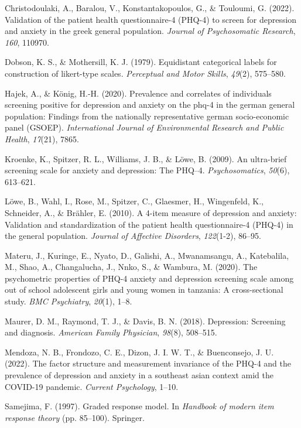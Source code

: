 \documentclass[
  man,floatsintext]{apa6}
\newlength{\cslhangindent}
\newlength{\cslentryspacingunit} %
\newenvironment{CSLReferences}[2] %
 {%
  \setlength{\parindent}{0pt}
  \ifodd #1
  \let\oldpar\par
  \def\par{\hangindent=\cslhangindent\oldpar}
  \fi
  \setlength{\parskip}{#2\cslentryspacingunit}
 }%
 {}
\begin{document}
\hypertarget{refs}{}
\begin{CSLReferences}{1}{0}
\leavevmode{}%
Christodoulaki, A., Baralou, V., Konstantakopoulos, G., \& Touloumi, G. (2022). Validation of the patient health questionnaire-4 (PHQ-4) to screen for depression and anxiety in the greek general population. \emph{Journal of Psychosomatic Research}, \emph{160}, 110970.

\leavevmode{}%
Dobson, K. S., \& Mothersill, K. J. (1979). Equidistant categorical labels for construction of likert-type scales. \emph{Perceptual and Motor Skills}, \emph{49}(2), 575--580.

\leavevmode{}%
Hajek, A., \& König, H.-H. (2020). Prevalence and correlates of individuals screening positive for depression and anxiety on the phq-4 in the german general population: Findings from the nationally representative german socio-economic panel (GSOEP). \emph{International Journal of Environmental Research and Public Health}, \emph{17}(21), 7865.

\leavevmode{}%
Kroenke, K., Spitzer, R. L., Williams, J. B., \& Löwe, B. (2009). An ultra-brief screening scale for anxiety and depression: The PHQ--4. \emph{Psychosomatics}, \emph{50}(6), 613--621.

\leavevmode{}%
Löwe, B., Wahl, I., Rose, M., Spitzer, C., Glaesmer, H., Wingenfeld, K., Schneider, A., \& Brähler, E. (2010). A 4-item measure of depression and anxiety: Validation and standardization of the patient health questionnaire-4 (PHQ-4) in the general population. \emph{Journal of Affective Disorders}, \emph{122}(1-2), 86--95.

\leavevmode{}%
Materu, J., Kuringe, E., Nyato, D., Galishi, A., Mwanamsangu, A., Katebalila, M., Shao, A., Changalucha, J., Nnko, S., \& Wambura, M. (2020). The psychometric properties of PHQ-4 anxiety and depression screening scale among out of school adolescent girls and young women in tanzania: A cross-sectional study. \emph{BMC Psychiatry}, \emph{20}(1), 1--8.

\leavevmode{}%
Maurer, D. M., Raymond, T. J., \& Davis, B. N. (2018). Depression: Screening and diagnosis. \emph{American Family Physician}, \emph{98}(8), 508--515.

\leavevmode{}%
Mendoza, N. B., Frondozo, C. E., Dizon, J. I. W. T., \& Buenconsejo, J. U. (2022). The factor structure and measurement invariance of the PHQ-4 and the prevalence of depression and anxiety in a southeast asian context amid the COVID-19 pandemic. \emph{Current Psychology}, 1--10.

\leavevmode{}%
Samejima, F. (1997). Graded response model. In \emph{Handbook of modern item response theory} (pp. 85--100). Springer.

\end{CSLReferences}


\clearpage
\renewcommand{\listfigurename}{Figure captions}
\end{document}
